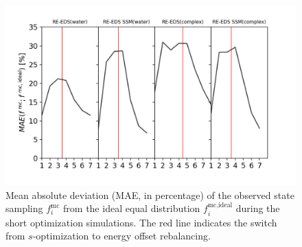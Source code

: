 \begin{figure}[H]
\centering
\includegraphics[width=\linewidth]{fig/results/ringOpening/paramOptimization/RingOpening_optimization_fractOptSampMAE.png}
\caption{Mean absolute deviation (MAE, in percentage) of the observed state sampling $f_i^{\text{mc}}$ from the ideal equal distribution $f_i^{\text{mc,ideal}}$ during the short optimization simulations. The red line indicates the switch from $s$-optimization to energy offset rebalancing.}
\label{SIfig:CHK1_RingOpening_optimization_fractOptSampMAE}
\end{figure}

\newpage
